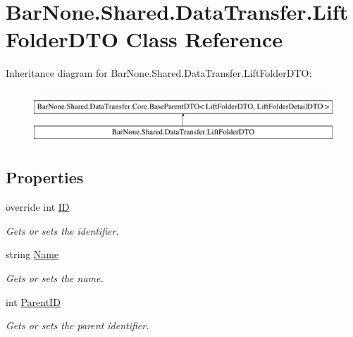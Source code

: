 \hypertarget{class_bar_none_1_1_shared_1_1_data_transfer_1_1_lift_folder_d_t_o}{}\section{Bar\+None.\+Shared.\+Data\+Transfer.\+Lift\+Folder\+D\+TO Class Reference}
\label{class_bar_none_1_1_shared_1_1_data_transfer_1_1_lift_folder_d_t_o}
Inheritance diagram for Bar\+None.\+Shared.\+Data\+Transfer.\+Lift\+Folder\+D\+TO\+:\begin{figure}[H]
\begin{center}
\leavevmode
\includegraphics[height=2.000000cm]{class_bar_none_1_1_shared_1_1_data_transfer_1_1_lift_folder_d_t_o}
\end{center}
\end{figure}
\subsection*{Properties}
\begin{DoxyCompactItemize}
\item 
override int \mbox{\hyperlink{class_bar_none_1_1_shared_1_1_data_transfer_1_1_lift_folder_d_t_o_a1f4e011ff09d393d5628b5865f7fab92}{ID}}
\begin{DoxyCompactList}\small\item\em Gets or sets the identifier. \end{DoxyCompactList}\item 
string \mbox{\hyperlink{class_bar_none_1_1_shared_1_1_data_transfer_1_1_lift_folder_d_t_o_af96624d470421e592088fb017f5e7c00}{Name}}
\begin{DoxyCompactList}\small\item\em Gets or sets the name. \end{DoxyCompactList}\item 
int \mbox{\hyperlink{class_bar_none_1_1_shared_1_1_data_transfer_1_1_lift_folder_d_t_o_aa83418fdd56581573fd6dc3ad79823fd}{Parent\+ID}}
\begin{DoxyCompactList}\small\item\em Gets or sets the parent identifier. \end{DoxyCompactList}\end{DoxyCompactItemize}


